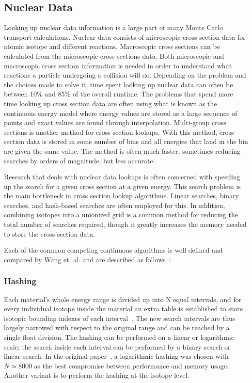 \subsection{\textbf{Nuclear Data}}

Looking up nuclear data information is a 
large part of many Monte Carlo transport calculations.
%
Nuclear data consists of microscopic cross section data for atomic isotope and different reactions.
%
Macroscopic cross sections can be calculated from the microscopic cross sections data.
%
Both microscopic and macroscopic cross section information is needed in order to understand what reactions a particle undergoing a collision will do.
%
Depending on the problem and the choices made to solve it, time spent looking up nuclear data can often be between 10\% and 85\% of the overall runtime.
%
The problems that spend more time looking up cross section data are often using what is known as the continuous energy model where energy values are stored as a large sequence of points and exact values are found through interpolation.
%
Multi-group cross sections is another method for cross section lookups.
%
With this method, cross section data is stored in some number of bins and all energies that land in the bin are given the same value. 
%
The method is often much faster, sometimes reducing searches by orders of magnitude, but less accurate.
%

%
Research that deals with nuclear data lookups is often concerned with speeding up the search for a given cross section at a given energy.
%
This search problem is the main bottleneck in cross section lookup algorithms.
%
Linear searches, binary searches, and hash-based searches are often employed for this.
%
In addition, combining isotopes into a unionized grid is a common method for reducing the total number of searches required, though it greatly increases the memory needed to store the cross section data.
%

Each of the common competing continuous algorithms is well defined and compared by Wang et. al. and are described as follows~\cite{wang2016competing}:
%
\subsubsection*{\textbf{Hashing}} Each material's whole energy range is divided up into N equal intervals, and for every individual isotope inside the material an extra table is established to store isotopic bounding indexes of each interval~\cite{brown2014new}. The new search intervals are thus largely narrowed with respect to the original range and can be reached by a single float division. The hashing can be performed on a linear or logarithmic scale; the search inside each interval can be performed by a binary search or linear search. In the original paper~\cite{brown2014new}, a logarithmic hashing was chosen with $ N \simeq 8000 $ as the best compromise between performance and memory usage. Another variant is to perform the hashing at the isotope level.
%
